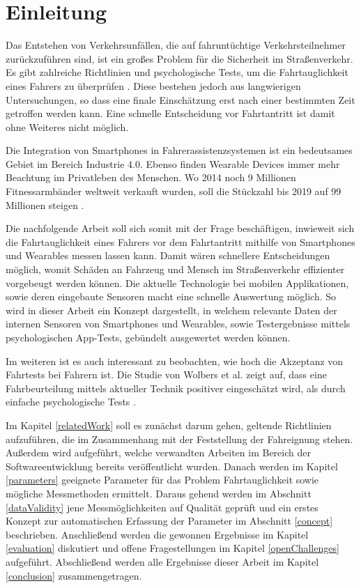 \section{Einleitung}
\label{introduction}

Das Entstehen von Verkehrsunfällen, die auf fahruntüchtige Verkehrsteilnehmer zurückzuführen sind, ist ein großes Problem für die Sicherheit im Straßenverkehr. Es gibt zahlreiche Richtlinien und psychologische Tests, um die Fahrtauglichkeit eines Fahrers zu überprüfen \cite{drivervehiclelicencingagency,testverfahrenpsychometrischefahreignung,begutachtungsrichtlinien,beurteilungskriterien}. Diese bestehen jedoch aus langwierigen Untersuchungen, so dass eine finale Einschätzung erst nach einer bestimmten Zeit getroffen werden kann.  Eine schnelle Entscheidung vor Fahrtantritt ist damit ohne Weiteres nicht möglich.

Die Integration von Smartphones in Fahrerassistenzsystemen ist ein bedeutsames Gebiet im Bereich Industrie 4.0. Ebenso finden Wearable Devices immer mehr Beachtung im Privatleben des Menschen. Wo 2014 noch 9 Millionen Fitnessarmbänder weltweit verkauft wurden, soll die Stückzahl bis 2019 auf 99 Millionen steigen \cite{wearabletracking}. 

Die nachfolgende Arbeit soll sich somit mit der Frage beschäftigen, inwieweit sich die Fahrtauglichkeit eines Fahrers vor dem Fahrtantritt mithilfe von Smartphones und Wearables messen lassen kann. Damit wären schnellere Entscheidungen möglich, womit Schäden an Fahrzeug und Mensch im Straßenverkehr effizienter vorgebeugt werden können. Die aktuelle Technologie bei mobilen Applikationen, sowie deren eingebaute Sensoren macht eine schnelle Auswertung möglich. So wird in dieser Arbeit ein Konzept dargestellt, in welchem relevante Daten der internen Sensoren von Smartphones und Wearables, sowie Testergebnisse mittels psychologischen App-Tests, gebündelt ausgewertet werden können. 

Im weiteren ist es auch interessant zu beobachten, wie hoch die Akzeptanz von Fahrtests bei Fahrern ist. Die Studie von Wolbers et al. zeigt auf, dass eine Fahrbeurteilung mittels aktueller Technik positiver eingeschätzt wird, als durch einfache psychologische Tests \cite{interaktivefahrsimulation}.

Im Kapitel \ref{relatedWork} soll es zunächst darum gehen, geltende Richtlinien aufzuführen, die im Zusammenhang mit der Feststellung der Fahreignung stehen. Außerdem wird aufgeführt, welche verwandten Arbeiten im Bereich der Softwareentwicklung bereits veröffentlicht wurden. Danach werden im Kapitel \ref{parameters} geeignete Parameter für das Problem Fahrtauglichkeit sowie mögliche Messmethoden ermittelt. Daraus gehend werden im Abschnitt \ref{dataValidity} jene Messmöglichkeiten auf Qualität geprüft und ein erstes Konzept zur automatischen Erfassung der Parameter im Abschnitt \ref{concept} beschrieben. Anschließend werden die gewonnen Ergebnisse im Kapitel \ref{evaluation} diskutiert und offene Fragestellungen im Kapitel \ref{openChallenges} aufgeführt. Abschließend werden alle Ergebnisse dieser Arbeit im Kapitel \ref{conclusion} zusammengetragen.
